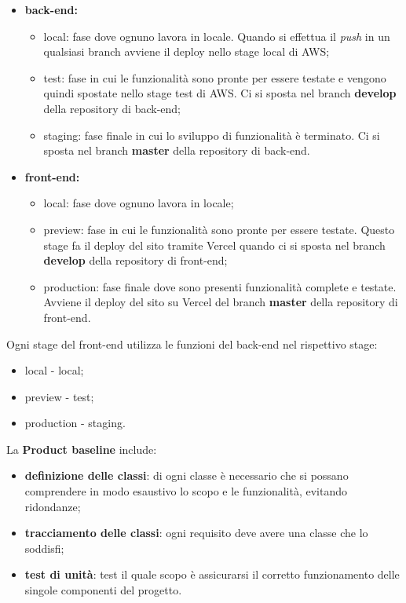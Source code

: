 \begin{itemize}
\item \textbf{back-end:}
	\begin{itemize}
	\item local: fase dove ognuno lavora in locale. Quando si effettua il \textit{push} in un qualsiasi branch avviene il deploy nello stage local di AWS;
	\item test: fase in cui le funzionalità sono pronte per essere testate e vengono quindi spostate nello stage test di AWS. Ci si sposta nel branch \textbf{develop} della repository di back-end;
	\item staging: fase finale in cui lo sviluppo di funzionalità è terminato. Ci si sposta nel branch \textbf{master} della repository di back-end.
	\end{itemize}
\item \textbf{front-end:}
	\begin{itemize}
	\item local: fase dove ognuno lavora in locale;
	\item preview: fase in cui le funzionalità sono pronte per essere testate. Questo stage fa il deploy del sito tramite Vercel quando ci si sposta nel branch \textbf{develop} della repository di front-end;
	\item production: fase finale dove sono presenti funzionalità complete e testate. Avviene il deploy del sito su Vercel del branch \textbf{master} della repository di front-end.
	\end{itemize}
\end{itemize} 
Ogni stage del front-end utilizza le funzioni del back-end nel rispettivo stage:
\begin{itemize}
	\item local - local;
	\item preview - test;
	\item production - staging.
\end{itemize}

La \textbf{Product baseline} include:
\begin{itemize}
\item \textbf{definizione delle classi}: di ogni classe è necessario che si possano comprendere in modo esaustivo lo scopo e le funzionalità, evitando ridondanze;
\item \textbf{tracciamento delle classi}: ogni requisito deve avere una classe che lo soddisfi; 
\item \textbf{test di unità}: test il quale scopo è assicurarsi il corretto funzionamento delle singole componenti del progetto.
\end{itemize}